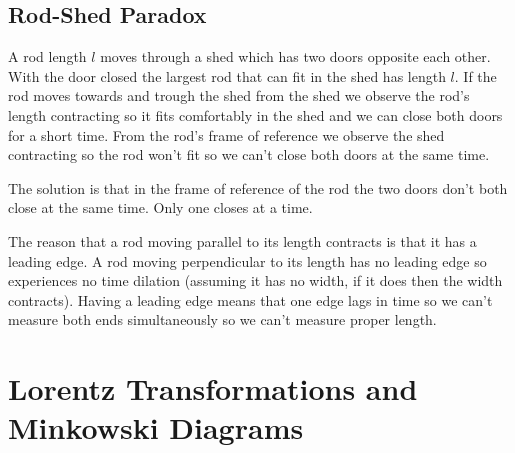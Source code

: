 \documentclass{article}
\begin{document}
    \subsection{Rod-Shed Paradox}
    A rod length \(l\) moves through a shed which has two doors opposite each other. 
    With the door closed the largest rod that can fit in the shed has length \(l\).
    If the rod moves towards and trough the shed from the shed we observe the rod's length contracting so it fits comfortably in the shed and we can close both doors for a short time.
    From the rod's frame of reference we observe the shed contracting so the rod won't fit so we can't close both doors at the same time.
    
    The solution is that in the frame of reference of the rod the two doors don't both close at the same time. Only one closes at a time.
    
    The reason that a rod moving parallel to its length contracts is that it has a leading edge.
    A rod moving perpendicular to its length has no leading edge so experiences no time dilation (assuming it has no width, if it does then the width contracts).
    Having a leading edge means that one edge lags in time so we can't measure both ends simultaneously so we can't measure proper length.
    
    \section{Lorentz Transformations and Minkowski Diagrams}
\end{document}
